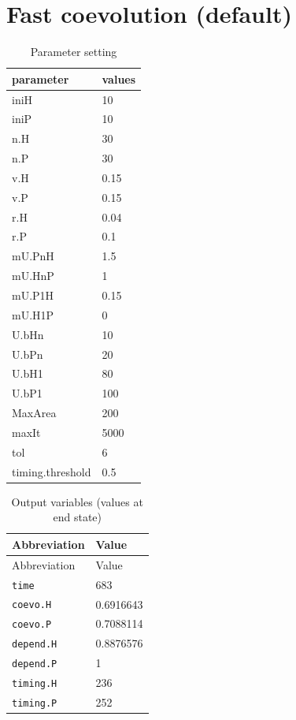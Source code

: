\documentclass[]{book}
\begin{document}
\newpage

\hypertarget{fast-coevolution-default}{%
\section{Fast coevolution (default)}\label{fast-coevolution-default}}

\begin{table}[!h]

\caption{\label{tab:1runcoevocoetaparspdf}Parameter setting}
\centering
\begin{tabular}{l|l}
\hline
parameter & values\\
\hline
iniH & 10\\
\hline
iniP & 10\\
\hline
n.H & 30\\
\hline
n.P & 30\\
\hline
v.H & 0.15\\
\hline
v.P & 0.15\\
\hline
r.H & 0.04\\
\hline
r.P & 0.1\\
\hline
mU.PnH & 1.5\\
\hline
mU.HnP & 1\\
\hline
mU.P1H & 0.15\\
\hline
mU.H1P & 0\\
\hline
U.bHn & 10\\
\hline
U.bPn & 20\\
\hline
U.bH1 & 80\\
\hline
U.bP1 & 100\\
\hline
MaxArea & 200\\
\hline
maxIt & 5000\\
\hline
tol & 6\\
\hline
timing.threshold & 0.5\\
\hline
\end{tabular}
\end{table}

\vspace{1cm}

\begin{longtable}[]{@{}ll@{}}
\caption{Output variables (values at end state)}\tabularnewline
\toprule
Abbreviation & Value\tabularnewline
\midrule
\endfirsthead
\toprule
Abbreviation & Value\tabularnewline
\midrule
\endhead
\texttt{time} & 683\tabularnewline
\texttt{coevo.H} & 0.6916643\tabularnewline
\texttt{coevo.P} & 0.7088114\tabularnewline
\texttt{depend.H} & 0.8876576\tabularnewline
\texttt{depend.P} & 1\tabularnewline
\texttt{timing.H} & 236\tabularnewline
\texttt{timing.P} & 252\tabularnewline
\bottomrule
\end{longtable}
\end{document}
